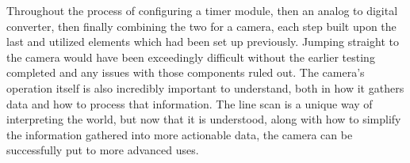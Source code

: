 \documentclass[conference]{IEEEtran}
\begin{document}
Throughout the process of configuring a timer module, then an analog to 
digital converter, then finally combining the two for a camera, each step 
built upon the last and utilized elements which had been set up previously. 
Jumping straight to the camera would have been exceedingly difficult without the
earlier testing completed and any issues with those components ruled out. The
camera's operation itself is also incredibly important to understand, both in 
how it gathers data and how to process that information. The line scan is a 
unique way of interpreting the world, but now that it is understood, along 
with how to simplify the information gathered into more actionable data, the 
camera can be successfully put to more advanced uses.
\end{document}
